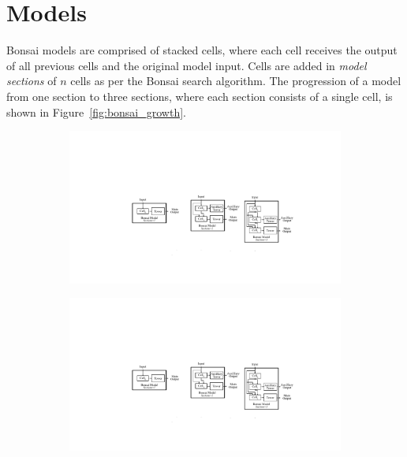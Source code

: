 \section{Models}
Bonsai models are comprised of stacked cells, where each cell receives the output of all previous cells and the original
model input. Cells are added in \textit{model sections} of $n$ cells as per the Bonsai search algorithm. The progression of a
model from one section to three sections, where each section consists of a single cell, is shown in Figure~\ref{fig:bonsai_growth}.
\begin{figure}[ht!]
\centering
\begin{subfigure}{.5\textwidth}
  \centering
  \vspace*{-.3cm}\includegraphics[width=.9\linewidth]{model1}
\end{subfigure}%
\begin{subfigure}{.5\textwidth}
  \centering
  \includegraphics[width=.9\linewidth]{model2}
\end{subfigure}\\ \vspace{1em} \hrulefill \vspace{1em}
\begin{subfigure}{.5\textwidth}

\end{subfigure}
\end{figure}
